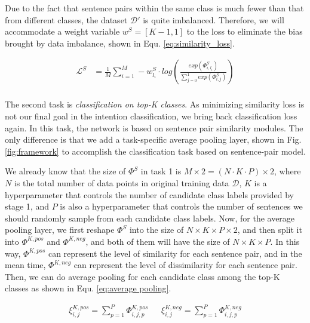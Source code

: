 \documentclass[letterpaper]{article} %
\begin{document}
  Due  to  the  fact that sentence pairs within the same class is much fewer than
  that from  different  classes,  the  dataset  $\mathcal{D'}$  is
  quite imbalanced.  Therefore, we will accommodate a weight variable $w^S = [K-1, 1]$
  to  the  loss  to eliminate the bias brought by data imbalance, shown in Equ.
  \ref{eq:similarity_loss}.

  \begin{equation}
    \begin{aligned}
      \mathcal{L}^{S}&=\frac{1}{M}\sum_{i=1}^{M}-w^S_{l_i}\cdot log(\frac{exp(\varPhi_{i,l_{i}}^S)}{\sum_{j=0}^{1}exp(\varPhi_{i,j}^S)}) \\
      \label{eq:similarity_loss}
    \end{aligned}
  \end{equation}

  The  second  task  is  \emph{classification  on  top-K classes}. As minimizing
  similarity  loss  is  not  our  final goal in the intention classification, we
  bring  back  classification  loss again. In this task, the network is based on
  sentence  pair  similarity  modules.  The  only  difference  is  that we add a
  task-specific  average  pooling  layer,  shown  in Fig. \ref{fig:framework} to
  accomplish the classification task based on sentence-pair model.

  We  already  know  that the size of ${\Phi}^S$ in task 1 is $M\times 2=(N\cdot
  K\cdot  P)\times  2$, where $N$ is the total number of data points in original
  training  data $\mathcal{D}$, $K$ is a hyperparameter that controls the number
  of   candidate   class  labels  provided  by  stage  1,  and  $P$  is  also  a
  hyperparameter that controls the number of sentences we should randomly sample
  from each candidate class labels. Now, for the average pooling layer, we first
  reshape  ${\Phi}^S$  into  the  size  of $N\times K\times P\times 2$, and then
  split  it  into  ${\Phi}^{K,pos}$  and ${\Phi}^{K,neg}$, and both of them will
  have  the  size  of  $N\times  K\times  P$.  In this way, ${\Phi}^{K,pos}$ can
  represent  the  level  of  similarity  for each sentence pair, and in the mean
  time,  ${\Phi}^{K,neg}$  can  represent  the  level  of dissimilarity for each
  sentence  pair. Then, we can do average pooling for each candidate class among
  the  top-K  classes  as  shown  in  Equ.  \ref{eq:average  pooling}.

  \begin{align}
    {\xi}_{i,j}^{K,pos} = \sum_{p=1}^{P}{\varPhi}_{i,j,p}^{K,pos} \ \ \ \ \ \ \ 
    {\xi}_{i,j}^{K,neg} = \sum_{p=1}^{P}{\varPhi}_{i,j,p}^{K,neg}
    \label{eq:average pooling}
  \end{align}
\end{document}
